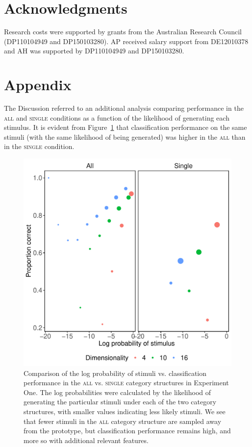 \documentclass[a4paper, doc, floatsintext]{apa6}
\begin{document}
\section{Acknowledgments}

Research costs were supported by grants from the Australian Research Council (DP110104949 and DP150103280). AP received salary support from DE12010378 and AH was supported by  DP110104949 and DP150103280.




\section{Appendix}

The Discussion referred to an additional analysis comparing performance in the \textsc{all} and \textsc{single} conditions as a function of the likelihood of generating each stimulus. It is evident from Figure~\ref{fig:stimulus-distribution} that classification performance on the same stimuli (with the same likelihood of being generated) was higher in the \textsc{all} than in the \textsc{single} condition.

\begin{figure}[h!]
  \includegraphics[width=0.9\linewidth]{figures/stim-prob-performance.pdf}
  \caption{Comparison of the log probability of stimuli vs. classification performance in the \textsc{all} vs. \textsc{single} category structures in Experiment One. The log probabilities were calculated by the likelihood of generating the particular stimuli under each of the two category structures, with smaller values indicating less likely stimuli. We see that fewer stimuli in the \textsc{all} category structure are sampled away from the prototype, but classification performance remains high, and more so with additional relevant features.}
  \label{fig:stimulus-distribution}
\end{figure}
\end{document}
